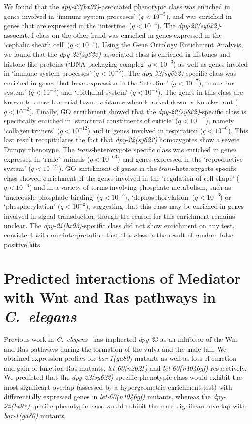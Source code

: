 \documentclass[8pt, twocolumn]{article}
\newcommand{\qval}[1]{$q<10^{-#1}$}
\newcommand{\cel}{\emph{C.~elegans}}
\newcommand{\gene}[1]{\mbox{\emph{#1}}}
\newcommand{\dpy}[1]{\gene{dpy-22#1}}
\newcommand{\bx}{\dpy{(bx93)}}
\newcommand{\sy}{\dpy{(sy622)}}
\begin{document}
We found that the \bx{}-associated phenotypic class was enriched in genes
involved in `immune system processes' (\qval{5}), and was enriched in genes that
are expressed in the `intestine' (\qval{4}). The \sy{}-associated class on the
other hand was enriched in genes expressed in the `cephalic sheath cell'
(\qval{4}). Using the Gene Ontology Enrichment Analysis, we found that the
\sy{}-associated class is enriched in histones and histone-like proteins (`DNA
packaging complex' \qval{3}) as well as genes involed in `immune system
processes' (\qval{5}). The \sy{}-specific class was enriched in genes that have
expression in the `intestine' (\qval{7}), `muscular system' (\qval{3}) and
`epithelial system' (\qval{2}). The genes in this class are known to cause
bacterial lawn avoidance when knocked down or knocked out (\qval{2}). Finally,
GO enrichment showed that the \sy{}-specific class is specifically enriched in
`structural constituents of cuticle' (\qval{12}), namely `collagen trimers'
(\qval{12}) and in genes involved in respiration (\qval{6}). This last result
recapitulates the fact that \sy{} homozygotes show a severe Dumpy phenotype. The
\emph{trans}-heterozygote specific class was enriched in genes expressed in
`male' animals (\qval{63}) and genes expressed in the `reproductive system'
(\qval{21}). GO enrichment of genes in the \emph{trans}-heterozygote specific
class showed enrichment of the genes involved in the `regulation of cell shape'
(\qval{6}) and in a variety of terms involving phosphate metabolism, such as
`nucleoside phosphate binding' (\qval{5}), `dephosphorylation' (\qval{3}) or
`phosphorylation' (\qval{2}), suggesting that this class may be enriched in
genes involved in signal transduction though the reason for this enrichment
remains unclear. The \bx{}-specific class did not show enrichment on any test,
consistent with our interpretation that this class is the result of random false
positive hits.

\section*{Predicted interactions of Mediator with Wnt and Ras pathways in
          \cel{}}
Previous work in \cel{}~\cite{Moghal2003,Zhang2000} has implicated \dpy{} as an
inhibitor of the Wnt and Ras pathways during the formation of the vulva and the
male tail. We obtained expression profiles for \gene{bar-1(ga80)} mutants as
well as loss-of-function and gain-of-function Ras mutants, \gene{let-60(n2021)}
and \gene{let-60(n1046gf)} respectively. We predicted that the \sy{}-specific
phenotypic class would exhibit the most significant overlap (assessed by a
hypergeometric enrichment test) with differentially expressed genes in
\gene{let-60(n1046gf)} mutants, whereas the \bx{}-specific phenotypic class
would exhibit the most significant overlap with \gene{bar-1(ga80)} mutants.
\end{document}
